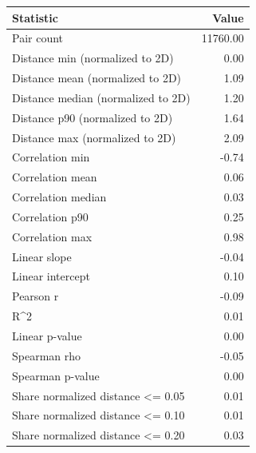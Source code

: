 \begin{tabular}{lr}
\toprule
Statistic & Value \\
\midrule
Pair count & 11760.00 \\
Distance min (normalized to 2D) & 0.00 \\
Distance mean (normalized to 2D) & 1.09 \\
Distance median (normalized to 2D) & 1.20 \\
Distance p90 (normalized to 2D) & 1.64 \\
Distance max (normalized to 2D) & 2.09 \\
Correlation min & -0.74 \\
Correlation mean & 0.06 \\
Correlation median & 0.03 \\
Correlation p90 & 0.25 \\
Correlation max & 0.98 \\
Linear slope & -0.04 \\
Linear intercept & 0.10 \\
Pearson r & -0.09 \\
R^2 & 0.01 \\
Linear p-value & 0.00 \\
Spearman rho & -0.05 \\
Spearman p-value & 0.00 \\
Share normalized distance <= 0.05 & 0.01 \\
Share normalized distance <= 0.10 & 0.01 \\
Share normalized distance <= 0.20 & 0.03 \\
\bottomrule
\end{tabular}
